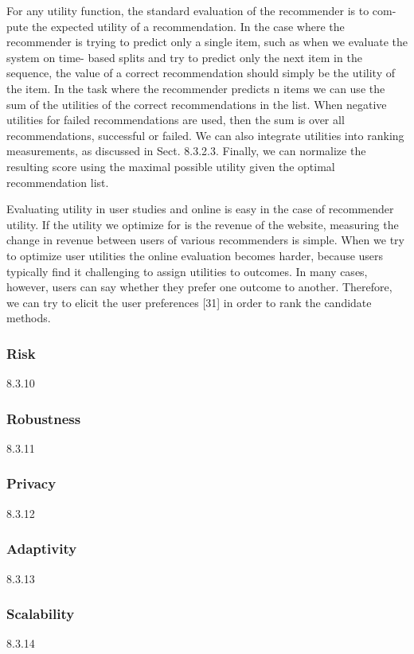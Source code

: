 For any utility function, the standard evaluation of the recommender is to com- pute the expected utility of a recommendation. In the case where the recommender is trying to predict only a single item, such as when we evaluate the system on time- based splits and try to predict only the next item in the sequence, the value of a correct recommendation should simply be the utility of the item. In the task where the recommender predicts n items we can use the sum of the utilities of the correct recommendations in the list. When negative utilities for failed recommendations are used, then the sum is over all recommendations, successful or failed. We can also integrate utilities into ranking measurements, as discussed in Sect. 8.3.2.3. Finally, we can normalize the resulting score using the maximal possible utility given the optimal recommendation list.

Evaluating utility in user studies and online is easy in the case of recommender utility. If the utility we optimize for is the revenue of the website, measuring the change in revenue between users of various recommenders is simple. When we try to optimize user utilities the online evaluation becomes harder, because users typically find it challenging to assign utilities to outcomes. In many cases, however, users can say whether they prefer one outcome to another. Therefore, we can try to elicit the user preferences [31] in order to rank the candidate methods.

\subsubsection{Risk}
{8.3.10}

\subsubsection{Robustness}
{8.3.11}

\subsubsection{Privacy}
{8.3.12}

\subsubsection{Adaptivity}
{8.3.13}

\subsubsection{Scalability}
{8.3.14}

